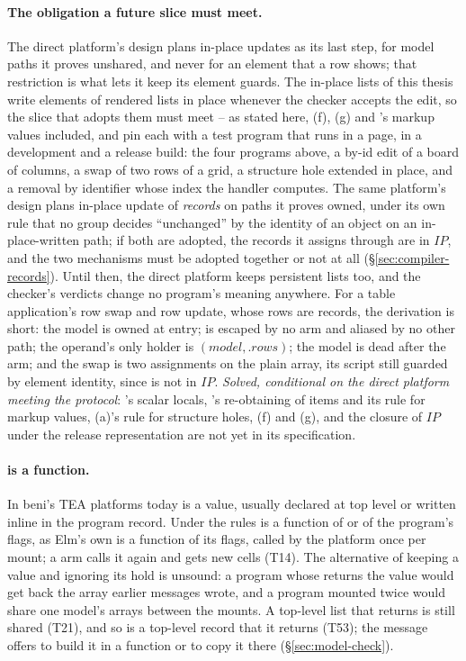 \paragraph{The obligation a future slice must meet.} The direct platform's design plans in-place updates
as its last step, for model paths it proves unshared, and never for an element that a row shows; that
restriction is what lets it keep its element guards. The in-place lists of this thesis write elements of
rendered lists in place whenever the checker accepts the edit, so the slice that adopts them must meet
-- as stated here, (f), (g) and 's markup values included, and pin each with a test
program that runs in a page, in a development and a release build: the four programs above, a by-id
 edit of a board of columns, a swap of two rows of a grid, a structure hole extended in place,
and a removal by identifier whose index the handler computes. The same platform's design plans in-place
update of \emph{records} on paths it proves owned, under its own rule that no group decides
``unchanged'' by the identity of an object on an in-place-written path; if both are adopted, the records it
assigns through are in $\mathit{IP}$, and the two mechanisms must be adopted together or not at all
(\S\ref{sec:compiler-records}). Until then, the direct platform keeps persistent lists too, and the
checker's verdicts change no program's meaning anywhere. For a table application's row swap and row update, whose
rows are records, the derivation is short: the model is owned at entry;  is escaped by no
arm and aliased by no other path; the operand's only holder is $(\mathit{model}, .\mathit{rows})$; the
model is dead after the arm; and the swap is two assignments on the plain array, its script still guarded
by element identity, since  is not in $\mathit{IP}$. \emph{Solved, conditional on the direct
platform meeting the protocol}: 's scalar locals, 's re-obtaining of items and its rule for
markup values, (a)'s rule for structure holes, (f) and (g), and the closure of $\mathit{IP}$ under the
release representation are not yet in its specification.

\paragraph{ is a function.} In beni's TEA platforms today  is a value, usually
declared at top level or written inline in the program record. Under the rules  is a function
of  or of the program's flags, as Elm's own  is a function of its flags, called by the
platform once per mount; a  arm calls it again and gets new cells (T14). The alternative of
keeping a value  and ignoring its hold is unsound: a program whose  returns the
value would get back the array earlier messages wrote, and a program mounted twice would share one model's
arrays between the mounts. A top-level list that  returns is still shared (T21), and so is a
top-level  record that it returns (T53); the message offers to build it in a function or
to copy it there (\S\ref{sec:model-check}).

